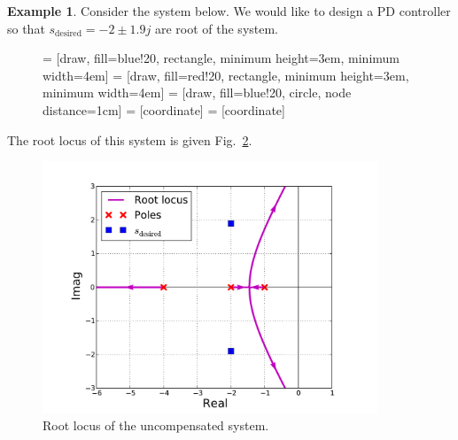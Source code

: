 \documentclass[a4paper,11pt]{report}
\theoremstyle{definition}
\newcommand{\des}{\textrm{desired}}
\newtheorem{mdexample}{Example}
\newenvironment{example}%
  {\vspace{0.1cm}\begin{mdframed}[backgroundcolor=lightgray]\begin{mdexample}}%
  {\end{mdexample}\end{mdframed}\vspace{0.1cm}}
\begin{document}
\begin{example}
  \label{ex:pddesign}
  Consider the system below. We would like to design a PD controller
  so that $s_\des=-2\pm1.9j$ are root of the system.

  \begin{figure}[H]
    \label{fig:pddesign}
    \centering
     = [draw, fill=blue!20, rectangle, minimum height=3em, minimum width=4em]
     = [draw, fill=red!20, rectangle, minimum height=3em, minimum width=4em]
     = [draw, fill=blue!20, circle, node distance=1cm]
     = [coordinate]
     = [coordinate]
  \end{figure}

  The root locus of this system is given
  Fig.~\ref{fig:design-uncomp}.

  \begin{figure}[H]
    \centering
    \includegraphics[width=10cm]{fig/design-uncomp.pdf}
    \caption{Root locus of the uncompensated system.}
    \label{fig:design-uncomp}
  \end{figure}


\end{example}
\end{document}
